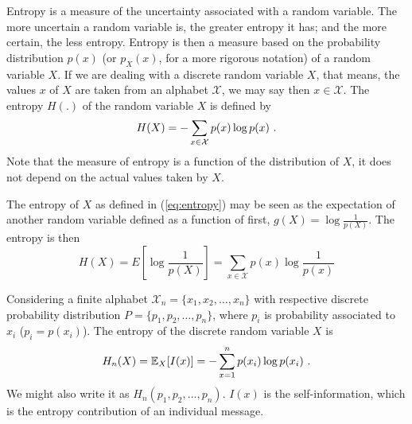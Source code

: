 Entropy is a measure of the uncertainty associated with a random variable. 
The more uncertain a random variable is, the greater entropy it has; and the more certain, the less entropy. 
Entropy is then a measure based on the probability distribution $p(x)$ (or $p_X(x)$, for a more rigorous notation) 
of a random variable $X$. If we are dealing with a discrete random variable $X$, that means, 
the values $x$ of $X$ are taken from an alphabet $\mathcal{X}$, we may say then $x \in \mathcal{X}$. 
The entropy $H(.)$ of the random variable $X$ is defined by
\begin{equation}
H(X) = - \sum_{x \in \mathcal{X}} p(x) \log p(x) \textmd{ .}
\label{eq:entropy}
\end{equation}
Note that the measure of entropy is a function of the distribution of $X$, 
it does not depend on the actual values taken by $X$.

The entropy of $X$ as defined in (\ref{eq:entropy}) may be seen as the expectation 
of another random variable defined as a function of first, $g(X) = \log \frac{1}{p(X)}$. 
The entropy is then
\begin{equation}
H(X) = E\left[ \log \frac{1}{p(X)} \right] = \sum_{x \in \mathcal{X}} p(x) \log \frac{1}{p(x)}
\end{equation}

Considering a finite alphabet $\mathcal{X}_n = \{x_1, x_2, \ldots, x_n \}$ with respective discrete 
probability distribution $P = \{p_1, p_2, \ldots, p_n\}$, where $p_i$ is probability associated to 
$x_i$ ($p_i = p(x_i)$). The entropy of the discrete random variable $X$ is
\begin{equation}
H_n(X) = \mathbb{E}_{X} [I(x)] = - \sum_{x = 1}^n p(x_i) \log p(x_i) \textmd{ .}
\end{equation}
We might also write it as $H_n(p_1, p_2, \ldots, p_n)$.
$I(x)$ is the self-information, which is the entropy contribution of an individual message.


